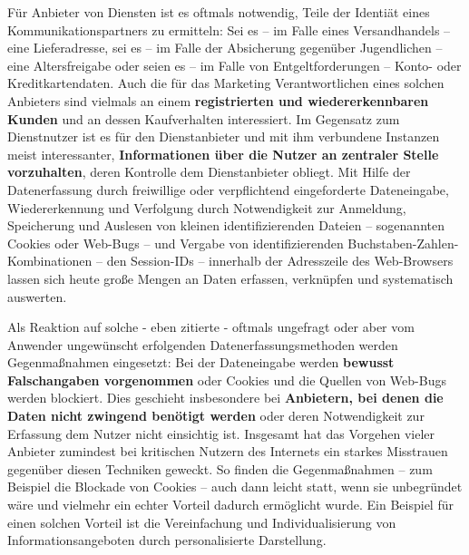 \begin{Zitat}

Für Anbieter von Diensten ist es oftmals notwendig, Teile der Identiät eines Kommunikationspartners zu ermitteln: Sei es – im Falle eines Versandhandels – eine Lieferadresse, sei es – im Falle der Absicherung gegenüber Jugendlichen – eine Altersfreigabe oder seien es – im Falle von Entgeltforderungen – Konto- oder Kreditkartendaten. Auch die für das Marketing Verantwortlichen eines solchen Anbieters sind vielmals an einem \textbf{registrierten und wiedererkennbaren Kunden} und an dessen Kaufverhalten interessiert.
Im Gegensatz zum Dienstnutzer ist es für den Dienstanbieter und mit ihm verbundene Instanzen meist interessanter, \textbf{Informationen über die Nutzer an zentraler Stelle 
vorzuhalten}, deren Kontrolle dem Dienstanbieter obliegt. Mit Hilfe der Datenerfassung
durch freiwillige oder verpflichtend eingeforderte Dateneingabe, Wiedererkennung und
Verfolgung durch Notwendigkeit zur Anmeldung, Speicherung und Auslesen von kleinen identifizierenden Dateien – sogenannten Cookies oder Web-Bugs – und Vergabe
von identifizierenden Buchstaben-Zahlen-Kombinationen – den Session-IDs – innerhalb
der Adresszeile des Web-Browsers lassen sich heute große Mengen an Daten erfassen,
verknüpfen und systematisch auswerten.

\end{Zitat}

\vspace{0.3cm}

\begin{Zitat}

Als Reaktion auf solche - eben zitierte - oftmals ungefragt oder aber vom Anwender ungewünscht erfolgenden Datenerfassungsmethoden werden Gegenmaßnahmen eingesetzt: Bei der Dateneingabe werden \textbf{bewusst Falschangaben vorgenommen} oder Cookies und die Quellen von Web-Bugs werden blockiert. Dies geschieht insbesondere bei \textbf{Anbietern, bei denen die Daten nicht zwingend benötigt werden} oder deren Notwendigkeit zur Erfassung dem Nutzer nicht einsichtig ist. Insgesamt hat das Vorgehen vieler Anbieter zumindest bei kritischen Nutzern des Internets ein starkes Misstrauen gegenüber diesen Techniken geweckt. So finden die Gegenmaßnahmen – zum Beispiel die Blockade von Cookies – auch dann leicht statt, wenn sie unbegründet wäre und vielmehr ein echter Vorteil dadurch
ermöglicht wurde. Ein Beispiel für einen solchen Vorteil ist die Vereinfachung und Individualisierung von Informationsangeboten durch personalisierte Darstellung.

\end{Zitat}

